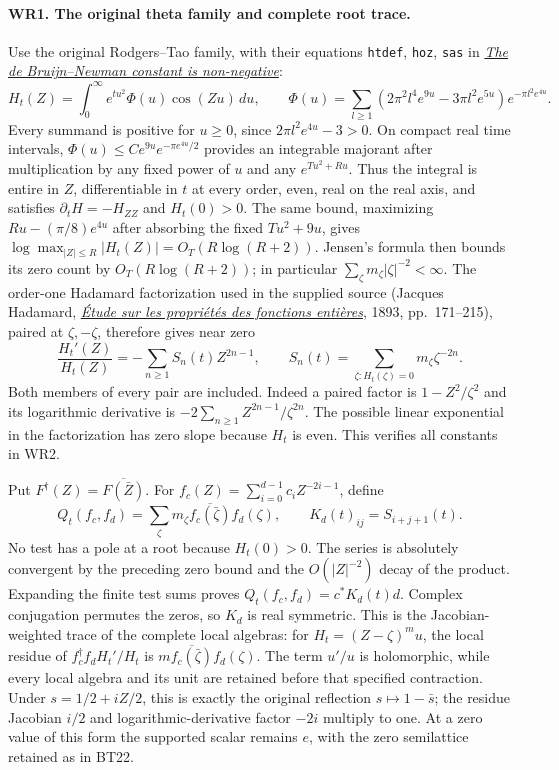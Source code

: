 \paragraph{WR1. The original theta family and complete root trace.}
Use the original Rodgers--Tao family, with their equations
\texttt{htdef}, \texttt{hoz}, \texttt{sas} in
\href{https://arxiv.org/abs/1801.05914v5}{\emph{The de Bruijn--Newman
constant is non-negative}}:
\[
 H_t(Z)=\int_0^\infty e^{tu^2}\Phi(u)\cos(Zu)\,du,\qquad
 \Phi(u)=\sum_{l\ge1}(2\pi^2l^4e^{9u}-3\pi l^2e^{5u})
                         e^{-\pi l^2e^{4u}}.
 \tag{WR1}
\]
Every summand is positive for $u\ge0$, since
$2\pi l^2e^{4u}-3>0$. On compact real time intervals,
$\Phi(u)\le C e^{9u}e^{-\pi e^{4u}/2}$ provides an integrable
majorant after multiplication by any fixed power of $u$ and any
$e^{Tu^2+R u}$. Thus the integral is entire in $Z$, differentiable
in $t$ at every order, even, real on the real axis, and satisfies
$\partial_tH=-H_{ZZ}$ and $H_t(0)>0$.
The same bound, maximizing $Ru-(\pi/8)e^{4u}$ after absorbing
the fixed $Tu^2+9u$, gives
$\log\max_{|Z|\le R}|H_t(Z)|=O_T(R\log(R+2))$.
Jensen's formula then bounds its zero count by $O_T(R\log(R+2))$;
in particular $\sum_\zeta m_\zeta|\zeta|^{-2}<\infty$.
The order-one Hadamard factorization used in the supplied source
(Jacques Hadamard,
\href{https://www.numdam.org/item/JMPA_1893_4_9__171_0/}
{\emph{\'Etude sur les propri\'et\'es des fonctions enti\`eres}},
1893, pp.~171--215),
paired at $\zeta,-\zeta$, therefore gives near zero
\[
 \frac{H_t'(Z)}{H_t(Z)}=-\sum_{n\ge1}S_n(t)Z^{2n-1},\qquad
 S_n(t)=\sum_{\zeta:H_t(\zeta)=0}m_\zeta\zeta^{-2n}.
 \tag{WR2}
\]
Both members of every pair are included. Indeed a paired factor is
$1-Z^2/\zeta^2$ and its logarithmic derivative is
$-2\sum_{n\ge1}Z^{2n-1}/\zeta^{2n}$. The possible linear
exponential in the factorization has zero slope because $H_t$ is
even. This verifies all constants in WR2.

Put $F^\dagger(Z)=\overline{F(\bar Z)}$. For
$f_c(Z)=\sum_{i=0}^{d-1}c_iZ^{-2i-1}$, define
\[
 Q_t(f_c,f_d)=\sum_\zeta m_\zeta
                \overline{f_c(\bar\zeta)}f_d(\zeta),\qquad
 K_d(t)_{ij}=S_{i+j+1}(t).
 \tag{WR3}
\]
No test has a pole at a root because $H_t(0)>0$.
The series is absolutely convergent by the preceding zero bound
and the $O(|Z|^{-2})$ decay of the product. Expanding the finite
test sums proves $Q_t(f_c,f_d)=c^*K_d(t)d$. Complex conjugation
permutes the zeros, so $K_d$ is real symmetric. This is the
Jacobian-weighted trace of the complete local algebras: for
$H_t=(Z-\zeta)^m u$, the local residue of
$f_c^\dagger f_d H_t'/H_t$ is
$m\overline{f_c(\bar\zeta)}f_d(\zeta)$. The term $u'/u$ is
holomorphic, while every local algebra and its unit are retained
before that specified contraction. Under $s=1/2+iZ/2$, this is
exactly the original reflection $s\mapsto1-\bar s$; the residue
Jacobian $i/2$ and logarithmic-derivative factor $-2i$ multiply to
one. At a zero value of this form the supported scalar remains
$e$, with the zero semilattice retained as in BT22.


